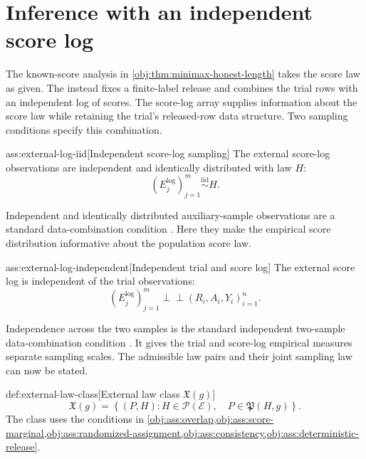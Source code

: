 \section{Inference with an independent score log}

The known-score analysis in \cref{obj:thm:minimax-honest-length} takes the score law as given. The  instead fixes a finite-label release and combines the trial rows with an independent log of  scores. The score-log array  supplies information about the score law while retaining the trial’s released-row data structure. Two sampling conditions specify this combination.

\begin{assumptionv}{ass:external-log-iid}[Independent score-log sampling]
The external score-log observations are independent and identically distributed with law \(H\):
\[
(E_j^{\mathrm{log}})_{j=1}^m\stackrel{\mathrm{iid}}{\sim}H.
\]
\end{assumptionv}

Independent and identically distributed auxiliary-sample observations are a standard data-combination condition \citep{MarellaPfeffermann2019}. Here they make the empirical score distribution informative about the population score law.

\begin{assumptionv}{ass:external-log-independent}[Independent trial and score log]
The external score log is independent of the trial observations:
\[
(E_j^{\mathrm{log}})_{j=1}^m
\mathrel{\perp\!\!\!\perp}
(R_i,A_i,Y_i)_{i=1}^n.
\]
\end{assumptionv}

Independence across the two samples is the standard independent two-sample data-combination condition \citep{MarellaPfeffermann2019}. It gives the trial and score-log empirical measures separate sampling scales. The admissible law pairs and their joint sampling law can now be stated.

\begin{definitionv}{def:external-law-class}[External law class $\mathfrak X(g)$]
\[
\mathfrak X(g)
=
\left\{
(P,H):
H\in\mathcal P(\mathcal E),\quad
P\in\mathfrak P(H,g)
\right\}.
\]
The class uses the conditions in \cref{obj:ass:overlap,obj:ass:score-marginal,obj:ass:randomized-assignment,obj:ass:consistency,obj:ass:deterministic-release}.
\end{definitionv}

